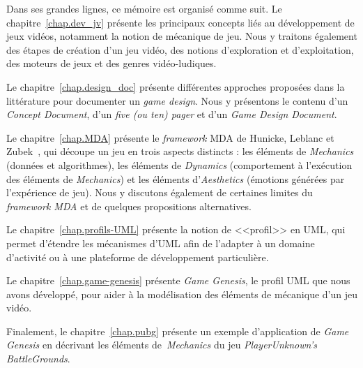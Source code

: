 \begin{introduction}
\begin{comment}
\end{comment}



Dans ses grandes lignes, ce m\'emoire est organis\'e comme suit.
Le chapitre~\ref{chap.dev_jv} pr\'esente les principaux concepts
li\'es au d\'eveloppement de jeux vid\'eos, notamment la notion de mécanique de jeu.
Nous y traitons également des étapes de création d'un jeu vidéo, des notions d'exploration et d'exploitation, des moteurs de jeux et des genres vidéo-ludiques. 


Le chapitre~\ref{chap.design_doc} pr\'esente diff\'erentes approches
propos\'ees dans la litt\'erature pour documenter un \emph{game design}.
Nous y présentons le contenu d'un \emph{Concept Document}, d'un \emph{five (ou ten) pager} et d'un \emph{Game Design Document}.

Le chapitre~\ref{chap.MDA} pr\'esente le \emph{framework} MDA de Hunicke, Leblanc et Zubek~\cite{MDA_formal}, qui découpe un jeu en trois aspects distincts : les éléments de \emph{Mechanics} (données et algorithmes), les éléments de \emph{Dynamics} (comportement à l'exécution des éléments de \emph{Mechanics}) et les éléments d'\emph{Aesthetics} (émotions générées par l'expérience de jeu). Nous y discutons également de certaines limites du \emph{framework MDA} et de quelques propositions alternatives.

Le chapitre~\ref{chap.profils-UML} pr\'esente la notion de <<profil>>
en UML, qui permet d'étendre les mécanismes d'UML afin de l'adapter à un domaine d'activité ou à une plateforme de développement particulière.

Le chapitre~\ref{chap.game-genesis} pr\'esente \emph{Game Genesis}, le
profil UML que nous avons d\'evelopp\'e, pour aider \`a la
mod\'elisation des \'el\'ements de m\'ecanique d'un jeu vid\'eo.

Finalement, le chapitre~\ref{chap.pubg} pr\'esente un exemple d'application de \emph{Game Genesis} en décrivant les éléments de~\emph{Mechanics} du jeu \emph{PlayerUnknown's BattleGrounds}.




\end{introduction}

